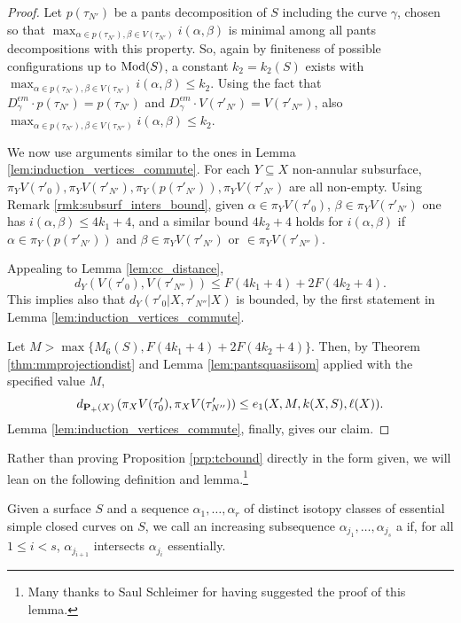 \begin{proof}
Let $p(\tau_{N'})$ be a pants decomposition of $S$ including the curve $\gamma$, chosen so that $\max_{\alpha \in p(\tau_{N'}), \beta \in V(\tau_{N'})} i(\alpha,\beta)$ is minimal among all pants decompositions with this property. So, again by finiteness of possible configurations up to $\mathrm{Mod}(S)$, a constant $k_2=k_2(S)$ exists with $\max_{\alpha \in p(\tau_{N'}), \beta \in V(\tau_{N'})} i(\alpha,\beta)\leq k_2$. Using the fact that $D_\gamma^{\epsilon m}\cdot p(\tau_{N'})=p(\tau_{N'})$ and $D_\gamma^{\epsilon m}\cdot V(\tau'_{N'})=V(\tau'_{N''})$, also $\max_{\alpha \in p(\tau_{N'}), \beta \in V(\tau_{N''})} i(\alpha,\beta)\leq k_2$.

We now use arguments similar to the ones in Lemma \ref{lem:induction_vertices_commute}. For each $Y\subseteq X$ non-annular subsurface, $\pi_Y V(\tau'_0),\pi_Y V(\tau'_{N'}), \pi_Y\left(p(\tau'_{N'})\right), \pi_Y V(\tau'_{N'})$ are all non-empty. Using Remark \ref{rmk:subsurf_inters_bound}, given $\alpha\in \pi_Y V(\tau'_0)$, $\beta\in\pi_Y V(\tau'_{N'})$ one has $i(\alpha,\beta)\leq 4k_1+4$, and a similar bound $4k_2+4$ holds for $i(\alpha,\beta)$ if $\alpha\in \pi_Y\left(p(\tau'_{N'})\right)$ and $\beta\in \pi_Y V(\tau'_{N'})$ or $\in \pi_Y V(\tau'_{N''})$.

Appealing to Lemma \ref{lem:cc_distance},
$$
d_Y\left(V(\tau'_0), V(\tau'_{N''})\right)\leq F(4k_1+4)+ 2 F(4k_2+4).
$$
This implies also that $d_Y\left(\tau'_0|X, \tau'_{N''}|X\right)$ is bounded, by the first statement in Lemma \ref{lem:induction_vertices_commute}.

Let $M> \max\{M_6(S),F(4k_1+4)+ 2 F(4k_2+4)\}$. Then, by Theorem \ref{thm:mmprojectiondist} and Lemma \ref{lem:pantsquasiisom} applied with the specified value $M$,
$$d_{{\mathbf{P}_+}(X)}\left(\pi_X V(\tau'_0),\pi_X V(\tau'_{N''})\right)\leq e_1(X,M,k(X,S),\ell(X)).$$
Lemma \ref{lem:induction_vertices_commute}, finally, gives our claim.
\end{proof}

Rather than proving Proposition \ref{prp:tcbound} directly in the form given, we will lean on the following definition and lemma.\footnote{Many thanks to Saul Schleimer for having suggested the proof of this lemma.}

\begin{defin}Given a surface $S$ and a sequence $\alpha_1,\ldots,\alpha_r$ of distinct isotopy classes of essential simple closed curves on $S$, we call an increasing subsequence $\alpha_{j_1},\ldots,\alpha_{j_s}$ a  if, for all $1\leq i < s$, $\alpha_{j_{i+1}}$ intersects $\alpha_{j_i}$ essentially.
\end{defin}

